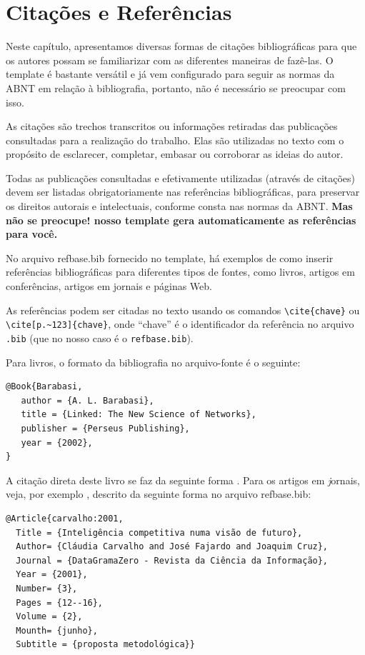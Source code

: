 \chapter{Citações e Referências}\label{referencias}
Neste capítulo, apresentamos diversas formas de citações bibliográficas para que os autores possam se familiarizar com as diferentes maneiras de fazê-las. O template é bastante versátil e já vem configurado para seguir as normas da ABNT em relação à bibliografia, portanto, não é necessário se preocupar com isso.

As citações são trechos transcritos ou informações retiradas das publicações consultadas para a realização do trabalho. Elas são utilizadas no texto com o propósito de esclarecer, completar, embasar ou corroborar as ideias do autor.

Todas as publicações consultadas e efetivamente utilizadas (através de citações) devem ser listadas obrigatoriamente nas referências bibliográficas, para preservar os direitos autorais e intelectuais, conforme consta nas normas da ABNT. \textbf{Mas não se preocupe! nosso template gera automaticamente as referências para você.}

No arquivo {\ttfamily refbase.bib} fornecido no template, há exemplos de como inserir referências bibliográficas para diferentes tipos de fontes, como livros, artigos em conferências, artigos em jornais e páginas Web.

As referências podem ser citadas no texto usando os comandos \verb|\cite{chave}| ou \verb|\cite[p.~123]{chave}|, onde ``chave'' é o identificador da referência no arquivo \verb|.bib| (que no nosso caso é o \verb|refbase.bib|).

Para livros, o formato da bibliografia no arquivo-fonte é o seguinte:
\begin{verbatim}
@Book{Barabasi,
   author = {A. L. Barabasi},
   title = {Linked: The New Science of Networks},
   publisher = {Perseus Publishing},
   year = {2002},
}
\end{verbatim}

A citação direta deste livro se faz da seguinte forma  \cite{Barabasi}. Para os artigos em {\textit jornais}, veja, por exemplo \cite{carvalho:2001},
descrito da seguinte forma no arquivo {\ttfamily refbase.bib}:
\begin{verbatim}
@Article{carvalho:2001,
  Title = {Inteligência competitiva numa visão de futuro},
  Author= {Cláudia Carvalho and José Fajardo and Joaquim Cruz},
  Journal = {DataGramaZero - Revista da Ciência da Informação},
  Year = {2001},
  Number= {3},
  Pages = {12--16},
  Volume = {2},
  Mounth= {junho},
  Subtitle = {proposta metodológica}}
\end{verbatim}



